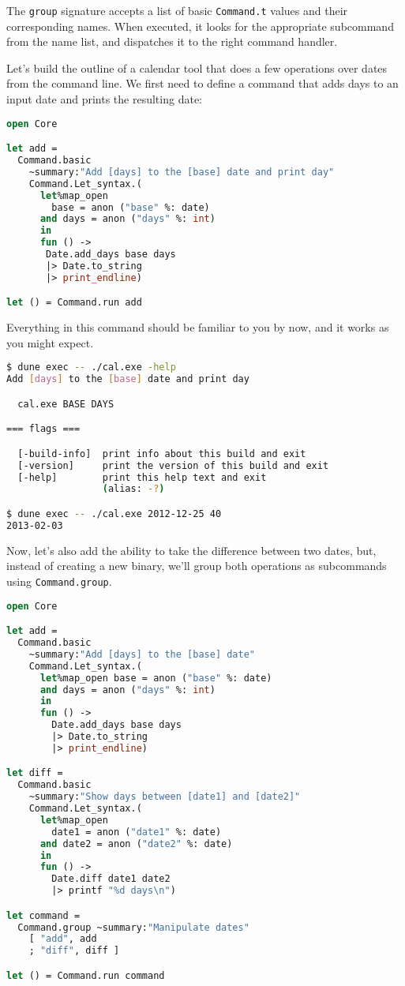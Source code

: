 The \passthrough{\lstinline!group!} signature accepts a list of basic
\passthrough{\lstinline!Command.t!} values and their corresponding
names. When executed, it looks for the appropriate subcommand from the
name list, and dispatches it to the right command handler.

Let's build the outline of a calendar tool that does a few operations
over dates from the command line. We first need to define a command that
adds days to an input date and prints the resulting date:

\begin{lstlisting}[language=Caml]
open Core

let add =
  Command.basic
    ~summary:"Add [days] to the [base] date and print day"
    Command.Let_syntax.(
      let%map_open
        base = anon ("base" %: date)
      and days = anon ("days" %: int)
      in
      fun () ->
       Date.add_days base days
       |> Date.to_string
       |> print_endline)

let () = Command.run add
\end{lstlisting}

Everything in this command should be familiar to you by now, and it
works as you might expect.

\begin{lstlisting}[language=bash]
$ dune exec -- ./cal.exe -help
Add [days] to the [base] date and print day

  cal.exe BASE DAYS

=== flags ===

  [-build-info]  print info about this build and exit
  [-version]     print the version of this build and exit
  [-help]        print this help text and exit
                 (alias: -?)

$ dune exec -- ./cal.exe 2012-12-25 40
2013-02-03
\end{lstlisting}

Now, let's also add the ability to take the difference between two
dates, but, instead of creating a new binary, we'll group both
operations as subcommands using \passthrough{\lstinline!Command.group!}.

\begin{lstlisting}[language=Caml]
open Core

let add =
  Command.basic
    ~summary:"Add [days] to the [base] date"
    Command.Let_syntax.(
      let%map_open base = anon ("base" %: date)
      and days = anon ("days" %: int)
      in
      fun () ->
        Date.add_days base days
        |> Date.to_string
        |> print_endline)

let diff =
  Command.basic
    ~summary:"Show days between [date1] and [date2]"
    Command.Let_syntax.(
      let%map_open
        date1 = anon ("date1" %: date)
      and date2 = anon ("date2" %: date)
      in
      fun () ->
        Date.diff date1 date2
        |> printf "%d days\n")

let command =
  Command.group ~summary:"Manipulate dates"
    [ "add", add
    ; "diff", diff ]

let () = Command.run command
\end{lstlisting}

